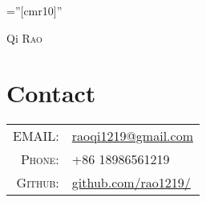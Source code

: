 \documentclass[a4paper,10pt]{article}
\begin{document}

\pagestyle{empty} %

\font\fb=''[cmr10]'' %

\par{\centering
		{\Huge Qi \textsc{Rao}
	}\bigskip\par}

\section{Contact}

\begin{tabular}{rl}
    \textsc{EMAIL:} & \href{mailto:raoqi1219@gmail.com}{raoqi1219@gmail.com}\\
    \textsc{Phone:}     & +86 18986561219\\
    \textsc{Github:}     & \href{https://github.com/rao1219/}{github.com/rao1219/}
\end{tabular}

\end{document}

